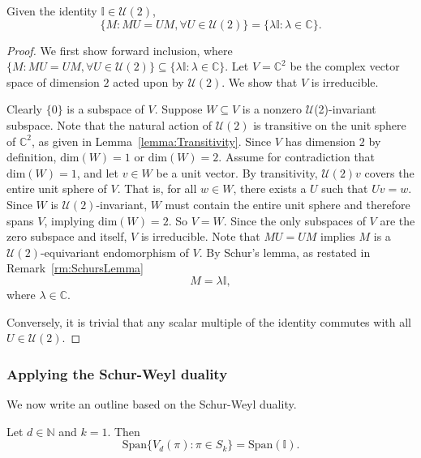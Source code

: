 \begin{theorem}
    Given the identity $\mathbb{I} \in \mathcal{U}(2)$,
    \begin{equation}
        \{M : M U = U M, \forall U \in \mathcal{U}(2) \} = \{\lambda \mathbb{I} : \lambda \in \mathbb{C} \}.
    \end{equation}
\end{theorem}

\begin{proof}
We first show forward inclusion, where $\{M : M U = U M, \forall U \in \mathcal{U}(2) \} \subseteq \{\lambda \mathbb{I} : \lambda \in \mathbb{C} \}$.
Let $V = \mathbb{C}^2$ be the complex vector space of dimension $2$ acted upon by $\mathcal{U}(2)$.
We show that $V$ is irreducible.

Clearly $\{0\}$ is a subspace of $V$.
Suppose $W \subseteq V$ is a nonzero $\mathcal{U}$(2)-invariant subspace.
Note that the natural action of $\mathcal{U}(2)$ is transitive on the unit sphere of $\mathbb{C}^2$, as given in Lemma~\ref{lemma:Transitivity}.
Since $V$ has dimension $2$ by definition, $\text{dim}(W) = 1$ or $\text{dim}(W) = 2$.
Assume for contradiction that $\text{dim}(W) = 1$, and let $v \in W$ be a unit vector.
By transitivity, $\mathcal{U}(2)v$ covers the entire unit sphere of $V$.
That is, for all $w \in W$, there exists a $U$ such that $Uv = w$.
Since $W$ is $\mathcal{U}(2)$-invariant, $W$ must contain the entire unit sphere and therefore spans $V$, implying $\text{dim}(W) = 2$.
So $V = W$.
Since the only subspaces of $V$ are the zero subspace and itself, $V$ is irreducible.
Note that $MU = UM$ implies $M$ is a $\mathcal{U}(2)$-equivariant endomorphism of $V$.
By Schur's lemma, as restated in Remark~\ref{rm:SchursLemma}
\begin{equation}
    M = \lambda \mathbb{I},
\end{equation}
where $\lambda \in \mathbb{C}$.

Conversely, it is trivial that any scalar multiple of the identity commutes with all $U \in \mathcal{U}(2)$.
\end{proof}

\subsubsection{Applying the Schur-Weyl duality}
We now write an outline based on the Schur-Weyl duality.

\begin{lemma}\label{lemma:1DSpanPermutationEqId}
    Let $d \in \mathbb{N}$ and $k = 1$.
    Then
    \begin{equation}
        \text{Span}\{ V_{d}(\pi) : \pi \in S_{k} \} = \text{Span}(\mathbb{I}).
    \end{equation}
\end{lemma}

